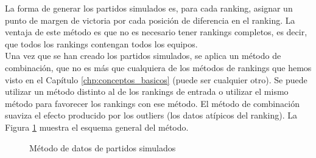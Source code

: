 La forma de generar los partidos simulados es, para cada ranking, asignar un punto de margen de victoria por cada posición de diferencia en el ranking. La ventaja de este método es que no es necesario tener rankings completos, es decir, que todos los rankings contengan todos los equipos. \\

Una vez que se han creado los partidos simulados, se aplica un método de combinación, que no es más que cualquiera de los métodos de rankings  que hemos visto en el Capítulo \ref{chp:conceptos_basicos} (puede ser cualquier otro). Se puede utilizar un método distinto al de los rankings de entrada o utilizar el mismo método para favorecer los rankings con ese método. El método de combinación suaviza el efecto producido por los outliers (los datos atípicos del ranking). La Figura \ref{fig:partidos_simulados} muestra el esquema general del método.

\begin{figure}[htb]
\centering
\partidossimulados
\caption{Método de datos de partidos simulados}
\label{fig:partidos_simulados}
\end{figure}

